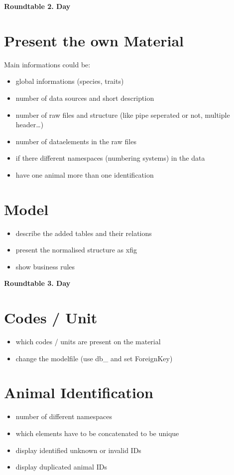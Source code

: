 \documentclass[10pt,a4paper,DIV14]{scrartcl}
\begin{document}
\centerline{\Large \bf Roundtable 2. Day}
\vspace{5mm}

\section{Present the own Material}

Main informations could be:
\begin{itemize}
\item global informations (species, traits)
\item number of data sources and short description
\item number of raw files and structure (like pipe seperated or not,
  multiple header\ldots)
\item number of dataelements in the raw files
\item if there different namespaces (numbering systems) in the data
\item have one animal more than one identification
\end{itemize}

\section{Model}

\begin{itemize}
\item describe the added tables and their relations
\item present the normalised structure as xfig
\item show business rules %
\end{itemize}


\centerline{\Large \bf Roundtable 3. Day}
\vspace{5mm}

\section{Codes / Unit}

\begin{itemize}
\item which codes / units are present on the material
\item change the modelfile (use db\_ and set ForeignKey)
\end{itemize}


\section{Animal Identification}

\begin{itemize}
\item number of different namespaces
\item which elements have to be concatenated to be unique
\item display identified unknown or invalid IDs
\item display duplicated animal IDs
\end{itemize}
\end{document}
